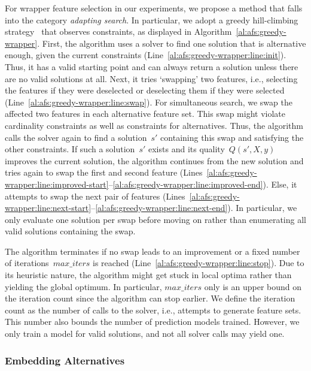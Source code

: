 \documentclass{article}
\theoremstyle{definition}
\begin{document}
For wrapper feature selection in our experiments, we propose a method that falls into the category \emph{adapting search}.
In particular, we adopt a greedy hill-climbing strategy~\cite{kohavi1997wrappers} that observes constraints, as displayed in Algorithm~\ref{al:afs:greedy-wrapper}.
First, the algorithm uses a solver to find one solution that is alternative enough, given the current constraints (Line~\ref{al:afs:greedy-wrapper:line:init}).
Thus, it has a valid starting point and can always return a solution unless there are no valid solutions at all.
Next, it tries `swapping' two features, i.e., selecting the features if they were deselected or deselecting them if they were selected (Line~\ref{al:afs:greedy-wrapper:line:swap}).
For simultaneous search, we swap the affected two features in each alternative feature set.
This swap might violate cardinality constraints as well as constraints for alternatives.
Thus, the algorithm calls the solver again to find a solution~$s'$ containing this swap and satisfying the other constraints.
If such a solution~$s'$ exists and its quality~$Q(s',X,y)$ improves the current solution, the algorithm continues from the new solution and tries again to swap the first and second feature (Lines~\ref{al:afs:greedy-wrapper:line:improved-start}--\ref{al:afs:greedy-wrapper:line:improved-end}).
Else, it attempts to swap the next pair of features (Lines~\ref{al:afs:greedy-wrapper:line:next-start}--\ref{al:afs:greedy-wrapper:line:next-end}).
In particular, we only evaluate one solution per swap before moving on rather than enumerating all valid solutions containing the swap.

The algorithm terminates if no swap leads to an improvement or a fixed number of iterations~$max\_iters$ is reached (Line~\ref{al:afs:greedy-wrapper:line:stop}).
Due to its heuristic nature, the algorithm might get stuck in local optima rather than yielding the global optimum.
In particular, $max\_iters$ only is an upper bound on the iteration count since the algorithm can stop earlier.
We define the iteration count as the number of calls to the solver, i.e., attempts to generate feature sets.
This number also bounds the number of prediction models trained.
However, we only train a model for valid solutions, and not all solver calls may yield one.

\subsubsection{Embedding Alternatives}
\label{sec:afs:approach:objectives:embedding}
\end{document}
